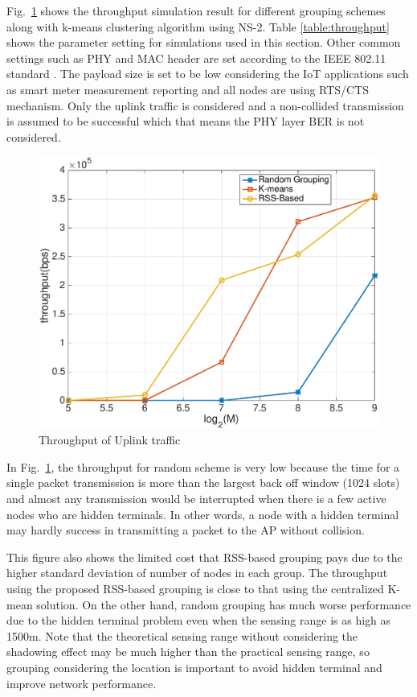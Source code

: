 Fig.~\ref{fig:throughput} shows the throughput simulation result for different grouping schemes along with k-means clustering algorithm using NS-2. Table \ref{table:throughput} shows the parameter setting for simulations used in this section. Other common settings such as PHY and MAC header are set according to the IEEE 802.11 standard \cite{wlan2011}. The payload size is set to be low considering the IoT applications such as smart meter measurement reporting and all nodes are using RTS/CTS mechanism. Only the uplink traffic is considered and a non-collided transmission is assumed to be successful which that means the PHY layer BER is not considered. 

\begin{figure} [th] 
  \centering
  \includegraphics[width=.95\textwidth]{figures/throughput}
  \caption{Throughput of Uplink traffic}
  \label{fig:throughput}
\end{figure}

 In Fig.~\ref{fig:throughput}, the throughput for random scheme is very low because the time for a single packet transmission is more than the largest back off window (1024 slots) and almost any transmission would be interrupted when there is a few active nodes who are hidden terminals. In other words, a node with a hidden terminal may hardly success in transmitting a packet to the AP without collision.

This figure also shows the limited cost that RSS-based grouping pays due to the higher standard deviation of number of nodes in each group. The throughput using the proposed RSS-based grouping is close to that using the centralized K-mean solution. On the other hand, random grouping has much worse performance due to the hidden terminal problem even when the sensing range is as high as 1500m. Note that the theoretical sensing range without considering the shadowing effect may be much higher than the practical sensing range, so grouping considering the location is important to avoid hidden terminal and improve network performance.


